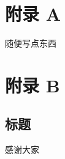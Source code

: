 \documentclass[bachelor,nocolorlinks, printoneside]{seuthesis} %
\begin{document}
\begin{appendices}
    \renewcommand{\thechapter}{\Alph{chapter}.}
    \chapter*{附录 A}
    随便写点东西
    \chapter*{附录 B}
    \section*{标题}
    
\end{appendices}

\begin{Acknowledgement}{}
感谢大家
\end{Acknowledgement}

\newpage
\printindex %

%
%
\end{document}
